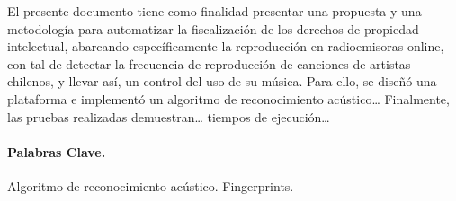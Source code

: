 
El presente documento tiene como finalidad presentar una propuesta y una metodología para automatizar la fiscalización de los derechos de propiedad intelectual, abarcando específicamente la reproducción en radioemisoras online, con tal de detectar la frecuencia de reproducción de canciones de artistas chilenos, y llevar así, un control del uso de su música. Para ello, se diseñó una plataforma e implementó un algoritmo de reconocimiento acústico… Finalmente, las pruebas realizadas demuestran… tiempos de ejecución…

\vspace{20mm}

\paragraph{Palabras Clave.}
Algoritmo de reconocimiento acústico. Fingerprints.

\newpage\null\thispagestyle{empty}\newpage
